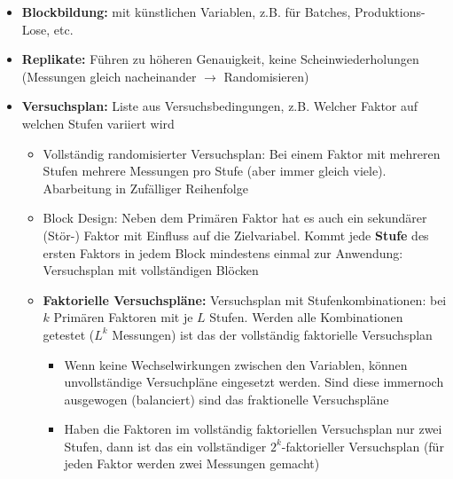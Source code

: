 \begin{itemize}
	\item \textbf{Blockbildung:} mit \glqq künstlichen \grqq Variablen, z.B. für Batches, Produktions-Lose, etc. 
	\item \textbf{Replikate:} Führen zu höheren Genauigkeit, keine Scheinwiederholungen (Messungen gleich nacheinander $\rightarrow$ Randomisieren)
	\item \textbf{Versuchsplan:} Liste aus Versuchsbedingungen, z.B. Welcher Faktor auf welchen Stufen variiert wird
	\begin{itemize}
		\item Vollständig randomisierter Versuchsplan: Bei einem Faktor mit mehreren Stufen mehrere Messungen pro Stufe (aber immer gleich viele). Abarbeitung in Zufälliger Reihenfolge
		\item Block Design: Neben dem Primären Faktor hat es auch ein sekundärer (Stör-) Faktor mit Einfluss auf die Zielvariabel.  Kommt jede \textbf{Stufe} des ersten Faktors in jedem Block mindestens einmal zur Anwendung: Versuchsplan mit vollständigen Blöcken
		\item \textbf{Faktorielle Versuchspläne:} Versuchsplan mit Stufenkombinationen: bei $k$ Primären Faktoren mit je $L$ Stufen. Werden alle Kombinationen getestet ($L^k$ Messungen) ist das der vollständig faktorielle Versuchsplan
		\begin{itemize}
			\item Wenn keine Wechselwirkungen zwischen den Variablen, können unvollständige Versuchpläne eingesetzt werden. Sind diese immernoch ausgewogen (balanciert) sind das fraktionelle Versuchspläne
			\item Haben die Faktoren im vollständig faktoriellen Versuchsplan nur zwei Stufen, dann ist das ein vollständiger $2^k$-faktorieller Versuchsplan (für jeden Faktor werden zwei Messungen gemacht)
		\end{itemize}
	\end{itemize}
\end{itemize}


